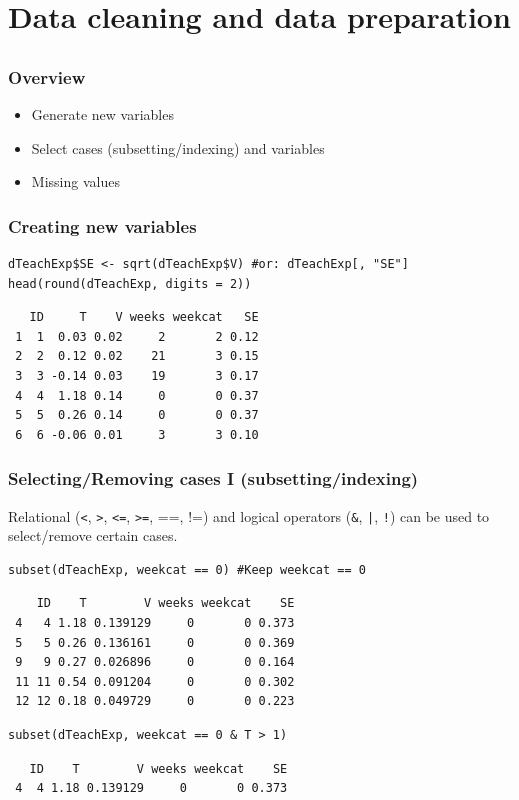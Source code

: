 \documentclass[bigger]{beamer}
\begin{document}
\section{Data cleaning and data preparation}
\label{sec-4}
\subsection{}
\begin{frame}
\frametitle{Overview}
\label{sec-4-1-1}

\begin{itemize}
\item Generate new variables
\item Select cases (subsetting/indexing) and variables
\item Missing values
\end{itemize}
\end{frame}
\begin{frame}[fragile,shrink=10]
\frametitle{Creating new variables}
\label{sec-4-1-2}


\lstset{language=R}
\begin{lstlisting}
dTeachExp$SE <- sqrt(dTeachExp$V) #or: dTeachExp[, "SE"]
head(round(dTeachExp, digits = 2))
\end{lstlisting}

\begin{verbatim}
   ID     T    V weeks weekcat   SE
 1  1  0.03 0.02     2       2 0.12
 2  2  0.12 0.02    21       3 0.15
 3  3 -0.14 0.03    19       3 0.17
 4  4  1.18 0.14     0       0 0.37
 5  5  0.26 0.14     0       0 0.37
 6  6 -0.06 0.01     3       3 0.10
\end{verbatim}
\end{frame}
\begin{frame}[fragile]
\frametitle{Selecting/Removing cases I (subsetting/indexing)}
\label{sec-4-1-3}

    Relational (\texttt{<}, \texttt{>}, \texttt{<=}, \texttt{>=}, ==, !=) and logical operators (\texttt{\&}, \texttt{|}, \texttt{!}) can be used to select/remove certain cases.

\lstset{language=R}
\begin{lstlisting}
subset(dTeachExp, weekcat == 0) #Keep weekcat == 0
\end{lstlisting}

\begin{verbatim}
    ID    T        V weeks weekcat    SE
 4   4 1.18 0.139129     0       0 0.373
 5   5 0.26 0.136161     0       0 0.369
 9   9 0.27 0.026896     0       0 0.164
 11 11 0.54 0.091204     0       0 0.302
 12 12 0.18 0.049729     0       0 0.223
\end{verbatim}



\lstset{language=R}
\begin{lstlisting}
subset(dTeachExp, weekcat == 0 & T > 1)
\end{lstlisting}

\begin{verbatim}
   ID    T        V weeks weekcat    SE
 4  4 1.18 0.139129     0       0 0.373
\end{verbatim}
\end{frame}
\end{document}
